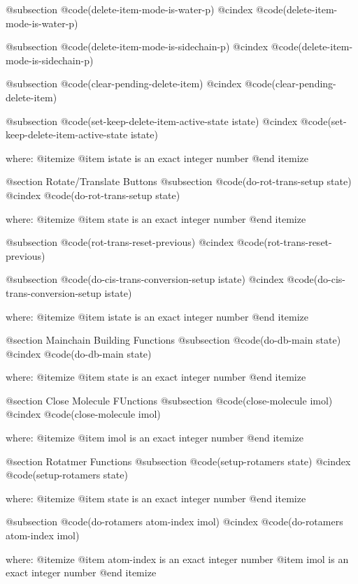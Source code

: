 @subsection @code{(delete-item-mode-is-water-p)}
@cindex @code{(delete-item-mode-is-water-p)}
 
@subsection @code{(delete-item-mode-is-sidechain-p)}
@cindex @code{(delete-item-mode-is-sidechain-p)}
 
@subsection @code{(clear-pending-delete-item)}
@cindex @code{(clear-pending-delete-item)}
 
@subsection @code{(set-keep-delete-item-active-state istate)}
@cindex @code{(set-keep-delete-item-active-state istate)}
 
where: 
 @itemize 
     @item istate is an exact integer number
 @end itemize



@section Rotate/Translate Buttons 
@subsection @code{(do-rot-trans-setup state)}
@cindex @code{(do-rot-trans-setup state)}
 
where: 
 @itemize 
     @item state is an exact integer number
 @end itemize


@subsection @code{(rot-trans-reset-previous)}
@cindex @code{(rot-trans-reset-previous)}
 
@subsection @code{(do-cis-trans-conversion-setup istate)}
@cindex @code{(do-cis-trans-conversion-setup istate)}
 
where: 
 @itemize 
     @item istate is an exact integer number
 @end itemize



@section Mainchain Building Functions 
@subsection @code{(do-db-main state)}
@cindex @code{(do-db-main state)}
 
where: 
 @itemize 
     @item state is an exact integer number
 @end itemize



@section Close Molecule FUnctions 
@subsection @code{(close-molecule imol)}
@cindex @code{(close-molecule imol)}
 
where: 
 @itemize 
     @item imol is an exact integer number
 @end itemize



@section Rotatmer Functions 
@subsection @code{(setup-rotamers state)}
@cindex @code{(setup-rotamers state)}
 
where: 
 @itemize 
     @item state is an exact integer number
 @end itemize


@subsection @code{(do-rotamers atom-index imol)}
@cindex @code{(do-rotamers atom-index imol)}
 
where: 
 @itemize 
     @item atom-index is an exact integer number
     @item imol is an exact integer number
 @end itemize


